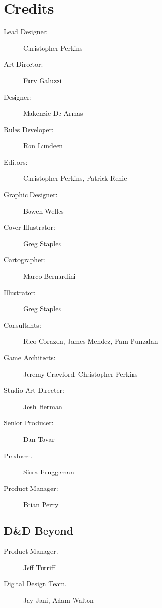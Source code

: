 \documentclass[10pt,a4paper,twoside,fancy,bg=print,twocolumn,openany,nodeprecatedcode]{dndbook}
\begin{document}
\section*{Credits}

\begin{description}
\item[Lead Designer:]
Christopher Perkins
\item[Art Director:]
Fury Galuzzi
\item[Designer:]
Makenzie De Armas
\item[Rules Developer:]
Ron Lundeen
\item[Editors:]
Christopher Perkins, Patrick Renie
\item[Graphic Designer:]
Bowen Welles
\item[Cover Illustrator:]
Greg Staples
\item[Cartographer:]
Marco Bernardini
\item[Illustrator:]
Greg Staples
\item[Consultants:]
Rico Corazon, James Mendez, Pam Punzalan
\item[Game Architects:]
Jeremy Crawford, Christopher Perkins
\item[Studio Art Director:]
Josh Herman
\item[Senior Producer:]
Dan Tovar
\item[Producer:]
Siera Bruggeman
\item[Product Manager:]
Brian Perry

\end{description}

\subsection{D\&D Beyond}

\begin{description}

\item[Product Manager.]
Jeff Turriff

\item[Digital Design Team.]
Jay Jani, Adam Walton

\end{description}
\end{document}

